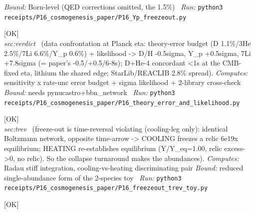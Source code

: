 \begin{description}
 \emph{Bound:} Born-level (QED corrections omitted, the 1.5\%)
\ \emph{Run:} \texttt{python3 receipts/P16\_cosmogenesis\_paper/P16\_Yp\_freezeout.py}
\item[\label{rcpt:P16_theory_error_and_likelihood}\texttt{P16\_theory\_error\_and\_likelihood}]\hfill\textsf{[OK]}\\
\textit{sec:verdict} \ (data confrontation at Planck eta: theory-error budget (D 1.1\%/3He 2.5\%/7Li 6.6\%/Y\_p 0.6\%) + likelihood -> D/H -0.5sigma, Y\_p +0.5sigma, 7Li +7.8sigma (= paper's -0.5/+0.5/6-8s); D+He-4 concordant <1s at the CMB-fixed eta, lithium the shared edge; StarLib/REACLIB 2.8\% spread). 
\emph{Computes:} sensitivity x rate-unc error budget + sigma likelihood + 2-library cross-check
 \emph{Bound:} needs pynucastro+bbn\_network
\ \emph{Run:} \texttt{python3 receipts/P16\_cosmogenesis\_paper/P16\_theory\_error\_and\_likelihood.py}
\item[\label{rcpt:P16_freezeout_trev_toy}\texttt{P16\_freezeout\_trev\_toy}]\hfill\textsf{[OK]}\\
\textit{sec:trev} \ (freeze-out is time-reversal violating (cooling-leg only): identical Boltzmann network, opposite time-arrow -> COOLING freezes a relic 6e19x equilibrium; HEATING re-establishes equilibrium (Y/Y\_eq=1.00, relic excess->0, no relic). So the collapse turnaround makes the abundances). 
\emph{Computes:} Radau stiff integration, cooling-vs-heating discriminating pair
 \emph{Bound:} reduced single-abundance form of the 2-species toy
\ \emph{Run:} \texttt{python3 receipts/P16\_cosmogenesis\_paper/P16\_freezeout\_trev\_toy.py}
\item[\label{rcpt:P17_the_alpha_family_is_a_foliation}\texttt{P17\_the\_alpha\_family\_is\_a\_foliation}]\hfill\textsf{[OK]}\\

\end{description}
